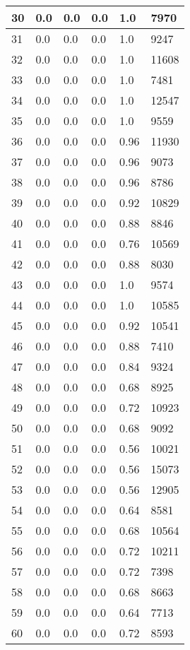 \begin{longtable}{|l|l|l|l|l|l|}
30 & 0.0 & 0.0 & 0.0 & 1.0 & 7970 \\ \hline 
31 & 0.0 & 0.0 & 0.0 & 1.0 & 9247 \\ \hline 
32 & 0.0 & 0.0 & 0.0 & 1.0 & 11608 \\ \hline 
33 & 0.0 & 0.0 & 0.0 & 1.0 & 7481 \\ \hline 
34 & 0.0 & 0.0 & 0.0 & 1.0 & 12547 \\ \hline 
35 & 0.0 & 0.0 & 0.0 & 1.0 & 9559 \\ \hline 
36 & 0.0 & 0.0 & 0.0 & 0.96 & 11930 \\ \hline 
37 & 0.0 & 0.0 & 0.0 & 0.96 & 9073 \\ \hline 
38 & 0.0 & 0.0 & 0.0 & 0.96 & 8786 \\ \hline 
39 & 0.0 & 0.0 & 0.0 & 0.92 & 10829 \\ \hline 
40 & 0.0 & 0.0 & 0.0 & 0.88 & 8846 \\ \hline 
41 & 0.0 & 0.0 & 0.0 & 0.76 & 10569 \\ \hline 
42 & 0.0 & 0.0 & 0.0 & 0.88 & 8030 \\ \hline 
43 & 0.0 & 0.0 & 0.0 & 1.0 & 9574 \\ \hline 
44 & 0.0 & 0.0 & 0.0 & 1.0 & 10585 \\ \hline 
45 & 0.0 & 0.0 & 0.0 & 0.92 & 10541 \\ \hline 
46 & 0.0 & 0.0 & 0.0 & 0.88 & 7410 \\ \hline 
47 & 0.0 & 0.0 & 0.0 & 0.84 & 9324 \\ \hline 
48 & 0.0 & 0.0 & 0.0 & 0.68 & 8925 \\ \hline 
49 & 0.0 & 0.0 & 0.0 & 0.72 & 10923 \\ \hline 
50 & 0.0 & 0.0 & 0.0 & 0.68 & 9092 \\ \hline 
51 & 0.0 & 0.0 & 0.0 & 0.56 & 10021 \\ \hline 
52 & 0.0 & 0.0 & 0.0 & 0.56 & 15073 \\ \hline 
53 & 0.0 & 0.0 & 0.0 & 0.56 & 12905 \\ \hline 
54 & 0.0 & 0.0 & 0.0 & 0.64 & 8581 \\ \hline 
55 & 0.0 & 0.0 & 0.0 & 0.68 & 10564 \\ \hline 
56 & 0.0 & 0.0 & 0.0 & 0.72 & 10211 \\ \hline 
57 & 0.0 & 0.0 & 0.0 & 0.72 & 7398 \\ \hline 
58 & 0.0 & 0.0 & 0.0 & 0.68 & 8663 \\ \hline 
59 & 0.0 & 0.0 & 0.0 & 0.64 & 7713 \\ \hline 
60 & 0.0 & 0.0 & 0.0 & 0.72 & 8593 \\ \hline 

\end{longtable}

